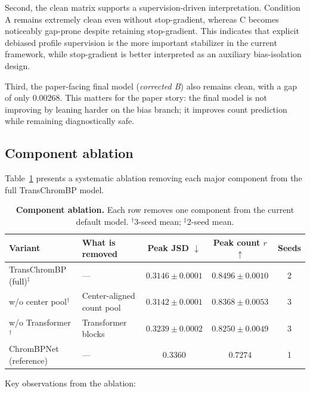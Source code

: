 \documentclass[11pt,a4paper]{article}
\begin{document}
Second, the clean matrix supports a supervision-driven interpretation.
Condition A remains extremely clean even without stop-gradient, whereas
C becomes noticeably gap-prone despite retaining stop-gradient. This
indicates that explicit debiased profile supervision is the more
important stabilizer in the current framework, while stop-gradient is
better interpreted as an auxiliary bias-isolation design.

Third, the paper-facing final model (\emph{corrected B}) also remains
clean, with a gap of only \(0.00268\). This matters for the paper story:
the final model is not improving by leaning harder on the bias branch;
it improves count prediction while remaining diagnostically safe.

\subsection{Component ablation}
\label{sec:ablation}

Table~\ref{tab:ablation} presents a systematic ablation removing each
major component from the full TransChromBP model.

\begin{table}[H]
\centering
\small
\caption{\textbf{Component ablation.} Each row removes one component
from the current default model. $^\dag$3-seed mean; $^\ddag$2-seed mean.}
\label{tab:ablation}
\begin{tabular}{llccc}
\toprule
Variant & What is removed & Peak JSD $\downarrow$ & Peak count $r$ $\uparrow$
  & Seeds \\
\midrule
TransChromBP (full)$^\ddag$
  & --- & $\mathbf{0.3146 \pm 0.0001}$ & $\mathbf{0.8496 \pm 0.0010}$ & 2 \\
\quad w/o center pool$^\dag$
  & Center-aligned count pool & $0.3142 \pm 0.0001$ & $0.8368 \pm 0.0053$ & 3 \\
\quad w/o Transformer$^\dag$
  & Transformer blocks & $0.3239 \pm 0.0002$ & $0.8250 \pm 0.0049$ & 3 \\
\midrule
ChromBPNet (reference)
  & --- & $0.3360$ & $0.7274$ & 1 \\
\bottomrule
\end{tabular}
\end{table}

Key observations from the ablation:
\end{document}

